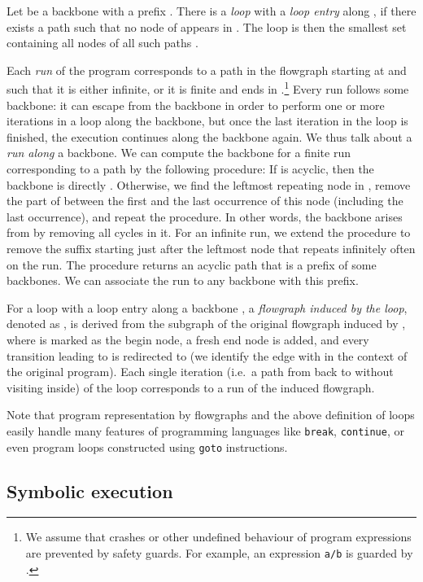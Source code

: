 \documentclass[10pt,a4paper]{article}
\begin{document}
Let  be a backbone with a prefix . There is a \emph{loop} 
with a \emph{loop entry}  along , if there exists a path  such
that no node of  appears in . The loop  is then the smallest
set containing all nodes of all such paths .

Each \emph{run} of the program corresponds to a path in the flowgraph
starting at  and such that it is either infinite, or it is
finite and ends in .\footnote{We assume that crashes or
  other undefined behaviour of program expressions are prevented by safety
  guards. For example, an expression \texttt{a/b} is guarded by
  .}  Every run follows some
backbone: it can escape from the backbone in order to perform
one or more iterations in a loop along the backbone, but once the last
iteration in the loop is finished, the execution continues along the
backbone again. We thus talk about a \emph{run along} a backbone. We can
compute the backbone for a finite run corresponding to a path  by the
following procedure: If  is acyclic, then the backbone is directly
. Otherwise, we find the leftmost repeating node in , remove the
part of  between the first and the last occurrence of this node
(including the last occurrence), and repeat the procedure. In other words,
the backbone arises from  by removing all cycles in it. For an
infinite run, we extend the procedure to remove the suffix starting just
after the leftmost node that repeats infinitely often on the run. The
procedure returns an acyclic path that is a prefix of some backbones. We can
associate the run to any backbone with this prefix.

For a loop  with a loop entry  along a backbone , a
\emph{flowgraph induced by the loop}, denoted as , is derived from
the subgraph of the original flowgraph induced by , where  is marked
as the begin node, a fresh end node  is added, and every transition  leading to  is redirected to  (we
identify the edge  with  in the context of the original
program). Each single iteration (i.e.~a path from  back to  without
visiting  inside) of the loop corresponds to a run of the
induced flowgraph. 


Note that program representation by flowgraphs and the above definition of
loops easily handle many features of programming languages like
\texttt{break}, \texttt{continue}, or even program loops constructed using
\texttt{goto} instructions.

\subsection{Symbolic execution}
\label{sec:symexpr}
\end{document}
